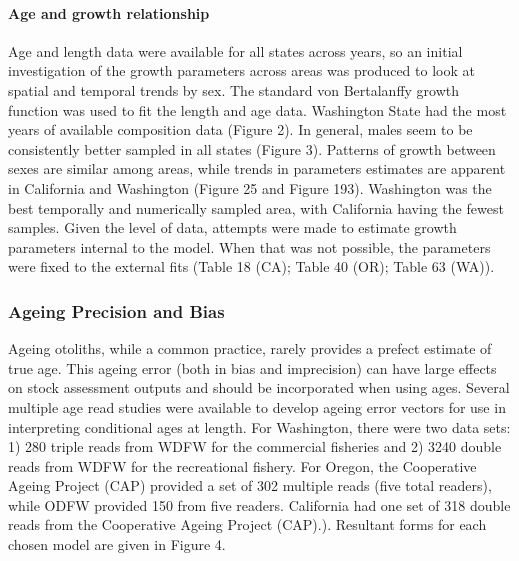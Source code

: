 \documentclass[11pt,
  english,
  letterpaper,
]{article}
\begin{document}
\hypertarget{age-and-growth-relationship}{%
\paragraph{Age and growth relationship}\label{age-and-growth-relationship}}

Age and length data were available for all states across years, so an initial investigation of the growth parameters across areas was produced to look at spatial and temporal trends by sex. The standard von Bertalanffy growth function was used to fit the length and age data. Washington State had the most years of available composition data (Figure 2). In general, males seem to be consistently better sampled in all states (Figure 3). Patterns of growth between sexes are similar among areas, while trends in parameters estimates are apparent in California and Washington (Figure 25 and Figure 193). Washington was the best temporally and numerically sampled area, with California having the fewest samples. Given the level of data, attempts were made to estimate growth parameters internal to the model. When that was not possible, the parameters were fixed to the external fits (Table 18 (CA); Table 40 (OR); Table 63 (WA)).

\hypertarget{ageing-precision-and-bias}{%
\subsubsection{Ageing Precision and Bias}\label{ageing-precision-and-bias}}

Ageing otoliths, while a common practice, rarely provides a prefect estimate of true age. This ageing error (both in bias and imprecision) can have large effects on stock assessment outputs and should be incorporated when using ages. Several multiple age read studies were available to develop ageing error vectors for use in interpreting conditional ages at length. For Washington, there were two data sets: 1) 280 triple reads from WDFW for the commercial fisheries and 2) 3240 double reads from WDFW for the recreational fishery. For Oregon, the Cooperative Ageing Project (CAP) provided a set of 302 multiple reads (five total readers), while ODFW provided 150 from five readers. California had one set of 318 double reads from the Cooperative Ageing Project (CAP).). Resultant forms for each chosen model are given in Figure 4.
\end{document}
